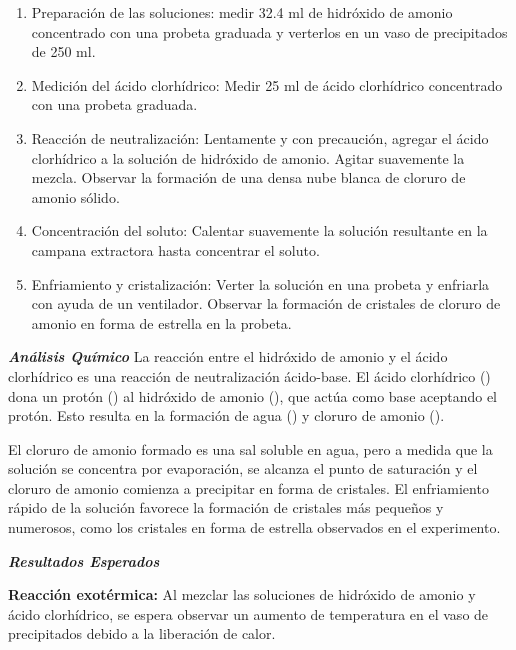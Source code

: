     \begin{enumerate}
        \item Preparación de las soluciones:  medir 32.4 ml de hidróxido de amonio concentrado con una probeta graduada y verterlos en un vaso de precipitados de 250 ml.  
        
        \item Medición del ácido clorhídrico: Medir 25 ml de ácido clorhídrico concentrado con una probeta graduada.  
        
        \item Reacción de neutralización: Lentamente y con precaución, agregar el ácido clorhídrico a la solución de hidróxido de amonio. Agitar suavemente la mezcla. Observar la formación de una densa nube blanca de cloruro de amonio sólido.  
        
        \item Concentración del soluto: Calentar suavemente la solución resultante en la campana extractora hasta concentrar el soluto.  
        
        \item Enfriamiento y cristalización: Verter la solución en una probeta y enfriarla con ayuda de un ventilador. Observar la formación de cristales de cloruro de amonio en forma de estrella en la probeta.
    \end{enumerate}  
    \textit{\textbf{Análisis Químico }}  
    La reacción entre el hidróxido de amonio y el ácido clorhídrico es una reacción de neutralización ácido-base. El ácido clorhídrico () dona un protón () al hidróxido de amonio (), que actúa como base aceptando el protón. Esto resulta en la formación de agua () y cloruro de amonio ().   
    
     El cloruro de amonio formado es una sal soluble en agua, pero a medida que la solución se concentra por evaporación, se alcanza el punto de saturación y el cloruro de amonio comienza a precipitar en forma de cristales. El enfriamiento rápido de la solución favorece la formación de cristales más pequeños y numerosos, como los cristales en forma de estrella observados en el experimento.   
    
    \textit{\textbf{Resultados Esperados  }} 
    
    \textbf{Reacción exotérmica:} Al mezclar las soluciones de hidróxido de amonio y ácido clorhídrico, se espera observar un aumento de temperatura en el vaso de precipitados debido a la liberación de calor.   
    
